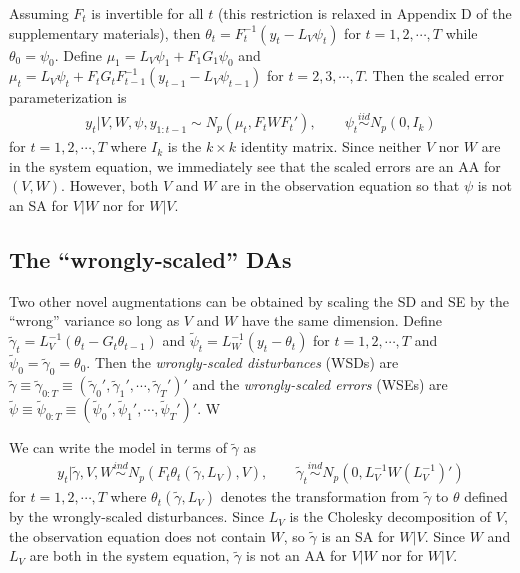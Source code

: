 \documentclass[12pt]{article}
\begin{document}
Assuming $F_t$ is invertible for all $t$ (this restriction is relaxed in Appendix D of the supplementary materials), then $\theta_t = F_t^{-1}(y_t - L_V\psi_t)$ for $t=1,2,\cdots,T$ while $\theta_0=\psi_0$. Define $\mu_1 = L_V\psi_1 + F_1G_1\psi_0$ and $\mu_t =L_V\psi_t + F_tG_tF_{t-1}^{-1}(y_{t-1} - L_{V}\psi_{t-1})$ for $t=2,3,\cdots,T$. Then the scaled error parameterization is 
\begin{align*}
  y_t|V,W,\psi,y_{1:t-1} \sim N_p(\mu_t, F_tWF_t'), \qquad \psi_t  \stackrel{iid}{\sim} N_p(0,I_k)
\end{align*}
for $t=1,2,\cdots,T$ where $I_k$ is the $k\times k$ identity matrix. Since neither $V$ nor $W$ are in the system equation, we immediately see that the scaled errors are an AA for $(V,W)$. However, both $V$ and $W$ are in the observation equation so that $\psi$ is not an SA for $V|W$ nor for $W|V$.

\subsection{The ``wrongly-scaled'' DAs}
Two other novel augmentations can be obtained by scaling the SD and SE by the ``wrong'' variance so long as $V$ and $W$ have the same dimension. Define $\tilde{\gamma}_t=L_V^{-1}(\theta_t - G_t\theta_{t-1})$ and $\tilde{\psi}_t=L_W^{-1}(y_t - \theta_t)$ for $t=1,2,\cdots,T$ and $\tilde{\psi}_0=\tilde{\gamma}_0=\theta_0$. Then the {\it wrongly-scaled disturbances} (WSDs) are $\tilde{\gamma}\equiv\tilde{\gamma}_{0:T}\equiv(\tilde{\gamma}_0',\tilde{\gamma}_1',\cdots,\tilde{\gamma}_T')'$ and the {\it wrongly-scaled errors} (WSEs) are $\tilde{\psi}\equiv\tilde{\psi}_{0:T}\equiv(\tilde{\psi}_0',\tilde{\psi}_1',\cdots,\tilde{\psi}_T')'$. W

We can write the model in terms of $\tilde{\gamma}$ as
\begin{align*}
  y_t|\tilde{\gamma},V,W \stackrel{ind}{\sim} N_p\left(F_t\theta_t(\tilde{\gamma},L_V), V\right), \qquad  
  \tilde{\gamma}_t \stackrel{ind}{\sim}N_p(0,L_V^{-1}W(L_V^{-1})')
\end{align*}
for $t=1,2,\cdots,T$ where $\theta_t(\tilde{\gamma},L_V)$ denotes the transformation from $\tilde{\gamma}$ to $\theta$ defined by the wrongly-scaled disturbances. Since $L_V$ is the Cholesky decomposition of $V$, the observation equation does not contain $W$, so $\tilde{\gamma}$ is an SA for $W|V$. Since $W$ and $L_V$ are both in the system equation, $\tilde{\gamma}$ is not an AA for $V|W$ nor for $W|V$. 
\end{document}
